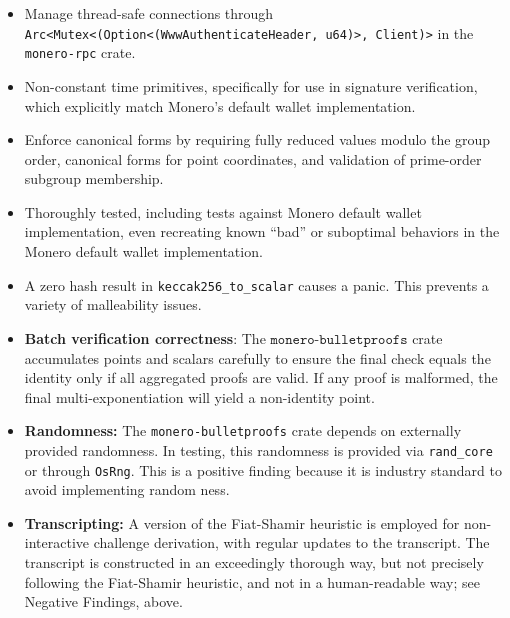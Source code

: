 \documentclass[12pt,a4paper]{article}
\begin{document}
\begin{itemize}
\item Manage thread-safe connections through \\ \texttt{Arc<Mutex<(Option<(WwwAuthenticateHeader, u64)>, Client)>} in the \\ \texttt{monero-rpc} crate.

\item Non-constant time primitives, specifically for use in signature verification, which explicitly match Monero's default wallet implementation.

\item Enforce canonical forms by requiring fully reduced values modulo the group order, canonical forms for point coordinates, and validation of prime-order subgroup membership.

\item Thoroughly tested, including tests against Monero default wallet implementation, even recreating known ``bad'' or suboptimal behaviors in the Monero default wallet implementation.

\item A zero hash result in \texttt{keccak256\_to\_scalar} causes a panic.  This prevents a variety of malleability issues. %

\item \textbf{Batch verification correctness}: The $\texttt{monero-bulletproofs}$ crate accumulates points and scalars  carefully to ensure the final check equals the identity only if all aggregated proofs are valid.  If any proof is malformed, the final multi-exponentiation will yield a non-identity point.

\item \textbf{Randomness:} The \texttt{monero-bulletproofs} crate depends on externally provided randomness. In testing, this randomness is provided via \texttt{rand\_core} or through \texttt{OsRng}. This is a positive finding because it is industry standard to avoid implementing random ness.

\item \textbf{Transcripting:}  A version of the Fiat-Shamir heuristic is employed for non-\\interactive challenge derivation, with regular updates to the transcript. The transcript is constructed in an exceedingly thorough way, but not precisely following the Fiat-Shamir heuristic, and not in a human-readable way; see Negative Findings, above.

\end{itemize}
\end{document}
